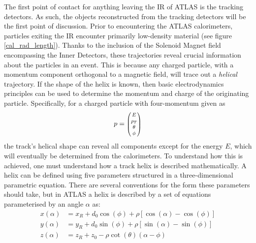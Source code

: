             The first point of contact for anything leaving the IR of ATLAS is the tracking detectors.
            As such, the objects reconstructed from the tracking detectors will be the first point of discussion.
            Prior to encountering the ATLAS calorimeters,
                particles exiting the IR encounter primarily low-density material (see figure \ref{cal_rad_length}).
            Thanks to the inclusion of the Solenoid Magnet field encompassing the Inner Detectors,
                these trajectories reveal crucial information about the particles in an event.
            This is because any charged particle, with a momentum component orthogonal to a magnetic field,
                will trace out a \textit{helical} trajectory.
            If the shape of the helix is known, then basic electrodynamics principles can be used to determine the
                momentum and charge of the originating particle.
            Specifically, for a charged particle with four-momentum given as 
            \begin{equation}
            p = \minimatrix{E \\ p_T \\ \theta \\ \phi}
            \end{equation}
            the track's helical shape can reveal all components except for the energy $E$,
                which will eventually be determined from the calorimeters.
            To understand how this is achieved, one must understand how a track helix is described mathematically.
            A helix can be defined using five parameters structured in a three-dimensional parametric equation.
            There are several conventions for the form these parameters should take,
                but in ATLAS a helix is described\cite{thesis_giacinto} by a set of equations parameterised by an angle $\alpha$ as:
            \begin{equation} \begin{split}
            x(\alpha) &= x_R + d_0 \cos(\phi) + \rho \left[ \cos(\alpha) - \cos(\phi) \right] \\
            y(\alpha) &= y_R + d_0 \sin(\phi) + \rho \left[ \sin(\alpha) - \sin(\phi) \right] \\
            z(\alpha) &= z_R + z_0 - \rho \cot(\theta) (\alpha - \phi)
            \end{split} \end{equation}


